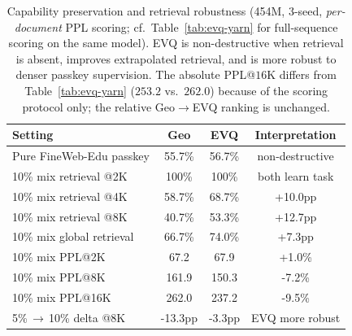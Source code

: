 \begin{table}[t]
\caption{Capability preservation and retrieval robustness (454M, 3-seed, \emph{per-document} PPL scoring; cf.\ Table~\ref{tab:evq-yarn} for full-sequence scoring on the same model). EVQ is non-destructive when retrieval is absent, improves extrapolated retrieval, and is more robust to denser passkey supervision. The absolute PPL@$16\mathrm{K}$ differs from Table~\ref{tab:evq-yarn} ($253.2$ vs.\ $262.0$) because of the scoring protocol only; the relative Geo$\to$EVQ ranking is unchanged.}
\label{tab:capability}
\centering
\small
\begin{tabular}{@{}l c c c@{}}
\toprule
Setting & Geo & EVQ & Interpretation \\
\midrule
Pure FineWeb-Edu passkey & 55.7\% & 56.7\% & non-destructive \\
10\% mix retrieval @2K & 100\% & 100\% & both learn task \\
10\% mix retrieval @4K & 58.7\% & 68.7\% & +10.0pp \\
10\% mix retrieval @8K & 40.7\% & 53.3\% & +12.7pp \\
10\% mix global retrieval & 66.7\% & 74.0\% & +7.3pp \\
10\% mix PPL@2K & 67.2 & 67.9 & +1.0\% \\
10\% mix PPL@8K & 161.9 & 150.3 & -7.2\% \\
10\% mix PPL@16K & 262.0 & 237.2 & -9.5\% \\
5\%\,$\rightarrow$\,10\% delta @8K & -13.3pp & -3.3pp & EVQ more robust \\
\bottomrule
\end{tabular}
\end{table}
